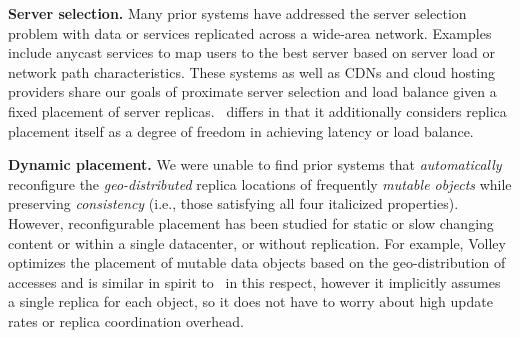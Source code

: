 \textbf{Server selection.} Many prior systems have addressed the server selection problem with data or services replicated across a wide-area network. Examples include anycast services \cite{oasis,Bhattacharjee:1997:AA:839292.843045,donar} to map users to the best server based on server load or network path characteristics. These systems as well as CDNs and cloud hosting providers %
share our goals of proximate server selection and load balance given a fixed placement of server replicas. \auspice\ differs in that it additionally considers replica placement itself as a degree of freedom in achieving latency or load balance.

\textbf{Dynamic placement.} We were unable to find prior systems that {\em automatically} reconfigure the {\em geo-distributed} replica locations of frequently {\em mutable objects} while preserving {\em consistency} (i.e., those satisfying all four italicized properties). However, reconfigurable placement has been studied for static or slow changing content \cite{gwertzman:95b} or within a single datacenter, or without replication. For example, Volley \cite{volley} optimizes the placement of mutable data objects based on the geo-distribution of accesses and is similar in spirit to \auspice\ in this respect, however it implicitly assumes a single replica for each object, so it does not have to worry about high update rates or replica coordination overhead. %





